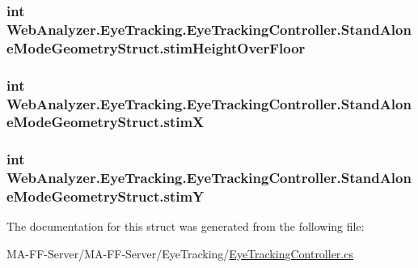 \subsubsection[{stim\+Height\+Over\+Floor}]{\setlength{\rightskip}{0pt plus 5cm}int Web\+Analyzer.\+Eye\+Tracking.\+Eye\+Tracking\+Controller.\+Stand\+Alone\+Mode\+Geometry\+Struct.\+stim\+Height\+Over\+Floor}\label{struct_web_analyzer_1_1_eye_tracking_1_1_eye_tracking_controller_1_1_stand_alone_mode_geometry_struct_a33965e997efc83dd71a23c08a80db5ee}
\hypertarget{struct_web_analyzer_1_1_eye_tracking_1_1_eye_tracking_controller_1_1_stand_alone_mode_geometry_struct_a64b395f1a76ba2f691c0ef01259168ba}{}
\subsubsection[{stim\+X}]{\setlength{\rightskip}{0pt plus 5cm}int Web\+Analyzer.\+Eye\+Tracking.\+Eye\+Tracking\+Controller.\+Stand\+Alone\+Mode\+Geometry\+Struct.\+stim\+X}\label{struct_web_analyzer_1_1_eye_tracking_1_1_eye_tracking_controller_1_1_stand_alone_mode_geometry_struct_a64b395f1a76ba2f691c0ef01259168ba}
\hypertarget{struct_web_analyzer_1_1_eye_tracking_1_1_eye_tracking_controller_1_1_stand_alone_mode_geometry_struct_ace1c440c06b7d36fc8b6fe6470bfc315}{}
\subsubsection[{stim\+Y}]{\setlength{\rightskip}{0pt plus 5cm}int Web\+Analyzer.\+Eye\+Tracking.\+Eye\+Tracking\+Controller.\+Stand\+Alone\+Mode\+Geometry\+Struct.\+stim\+Y}\label{struct_web_analyzer_1_1_eye_tracking_1_1_eye_tracking_controller_1_1_stand_alone_mode_geometry_struct_ace1c440c06b7d36fc8b6fe6470bfc315}


The documentation for this struct was generated from the following file\+:\begin{DoxyCompactItemize}
\item 
M\+A-\/\+F\+F-\/\+Server/\+M\+A-\/\+F\+F-\/\+Server/\+Eye\+Tracking/\hyperlink{_eye_tracking_controller_8cs}{Eye\+Tracking\+Controller.\+cs}\end{DoxyCompactItemize}

